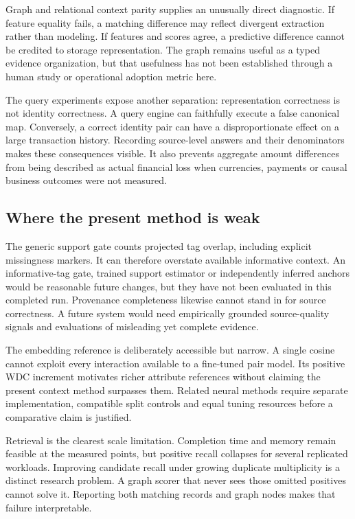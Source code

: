 \documentclass[11pt,letterpaper]{article}
\begin{document}
Graph and relational context parity supplies an unusually direct diagnostic. If feature equality fails, a matching difference may reflect divergent extraction rather than modeling. If features and scores agree, a predictive difference cannot be credited to storage representation. The graph remains useful as a typed evidence organization, but that usefulness has not been established through a human study or operational adoption metric here.

The query experiments expose another separation: representation correctness is not identity correctness. A query engine can faithfully execute a false canonical map. Conversely, a correct identity pair can have a disproportionate effect on a large transaction history. Recording source-level answers and their denominators makes these consequences visible. It also prevents aggregate amount differences from being described as actual financial loss when currencies, payments or causal business outcomes were not measured.

\subsection{Where the present method is weak}
The generic support gate counts projected tag overlap, including explicit missingness markers. It can therefore overstate available informative context. An informative-tag gate, trained support estimator or independently inferred anchors would be reasonable future changes, but they have not been evaluated in this completed run. Provenance completeness likewise cannot stand in for source correctness. A future system would need empirically grounded source-quality signals and evaluations of misleading yet complete evidence.

The embedding reference is deliberately accessible but narrow. A single cosine cannot exploit every interaction available to a fine-tuned pair model. Its positive WDC increment motivates richer attribute references without claiming the present context method surpasses them. Related neural methods require separate implementation, compatible split controls and equal tuning resources before a comparative claim is justified.

Retrieval is the clearest scale limitation. Completion time and memory remain feasible at the measured points, but positive recall collapses for several replicated workloads. Improving candidate recall under growing duplicate multiplicity is a distinct research problem. A graph scorer that never sees those omitted positives cannot solve it. Reporting both matching records and graph nodes makes that failure interpretable.
\end{document}
